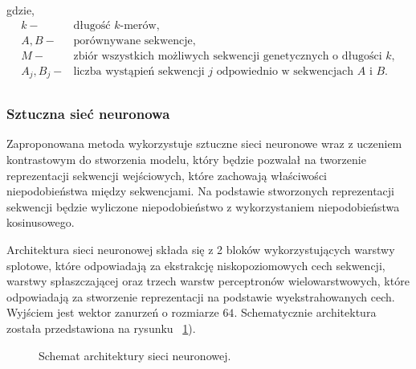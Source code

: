                 gdzie,
                \begin{align*} 
                    k -& \text{długość $k$-merów}, \\
                    A, B -& \text{porównywane sekwencje}, \\
                    M -& \text{zbiór wszystkich możliwych sekwencji genetycznych o długości $k$}, \\
                    A_j, B_j -& \text{liczba wystąpień sekwencji } j \text{ odpowiednio w sekwencjach } A \text{ i } B. \\
                \end{align*}
            
            \subsubsection{Sztuczna sieć neuronowa}
            
                Zaproponowana metoda wykorzystuje sztuczne sieci neuronowe wraz z uczeniem kontrastowym do stworzenia modelu, który będzie pozwalał na tworzenie reprezentacji sekwencji wejściowych, które zachowają właściwości niepodobieństwa między sekwencjami. Na podstawie stworzonych reprezentacji sekwencji będzie wyliczone niepodobieństwo z wykorzystaniem niepodobieństwa kosinusowego.
    
    
                    Architektura sieci neuronowej składa się z 2 bloków wykorzystujących warstwy splotowe, które odpowiadają za ekstrakcję niskopoziomowych cech sekwencji, warstwy spłaszczającej oraz trzech warstw perceptronów wielowarstwowych, które odpowiadają za stworzenie reprezentacji na podstawie wyekstrahowanych cech. Wyjściem jest wektor zanurzeń o rozmiarze $64$. Schematycznie architektura została przedstawiona na rysunku ~\ref{Architektura}).
    
                    \begin{figure}[H]
                        \begin{center}
                            
                        \end{center}
                        \caption{
                            Schemat architektury sieci neuronowej.
                        } 
                        \label{Architektura}
                    \end{figure}
    
